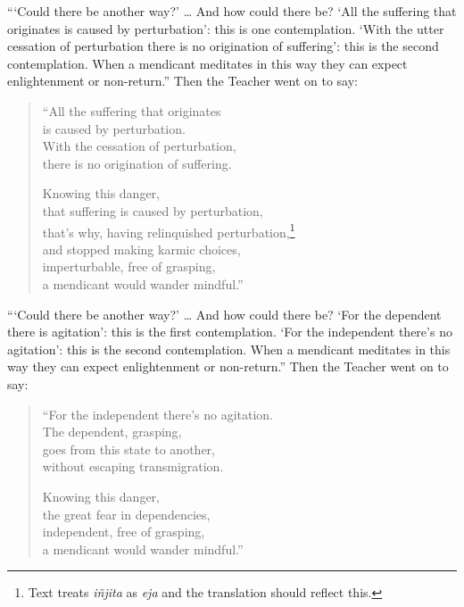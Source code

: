 \documentclass[12pt,openany]{book}%
\begin{document}
“‘Could there be another way?’ … And how could there be? ‘All the suffering that originates is caused by perturbation’: this is one contemplation. ‘With the utter cessation of perturbation there is no origination of suffering’: this is the second contemplation. When a mendicant meditates in this way they can expect enlightenment or non-return.” Then the Teacher went on to say: 

\begin{verse}%
“All the suffering that originates \\
is caused by perturbation. \\
With the cessation of perturbation, \\
there is no origination of suffering. 

Knowing this danger, \\
that suffering is caused by perturbation, \\
that’s why, having relinquished perturbation,\footnote{Text treats \textit{\textsanskrit{iñjita}} as \textit{eja} and the translation should reflect this. } \\
and stopped making karmic choices, \\
imperturbable, free of grasping, \\
a mendicant would wander mindful.” 

%
\end{verse}

“‘Could there be another way?’ … And how could there be? ‘For the dependent there is agitation’: this is the first contemplation. ‘For the independent there’s no agitation’: this is the second contemplation. When a mendicant meditates in this way they can expect enlightenment or non-return.” Then the Teacher went on to say: 

\begin{verse}%
“For the independent there’s no agitation. \\
The dependent, grasping, \\
goes from this state to another, \\
without escaping transmigration. 

Knowing this danger, \\
the great fear in dependencies, \\
independent, free of grasping, \\
a mendicant would wander mindful.” 

%
\end{verse}
\end{document}
